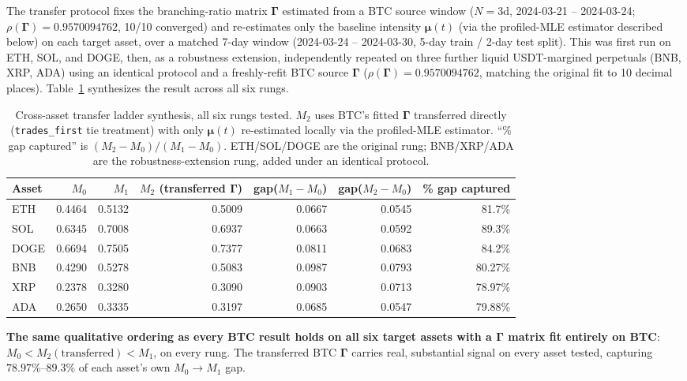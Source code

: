 The transfer protocol fixes the branching-ratio matrix
$\boldsymbol{\Gamma}$ estimated from a BTC source window
($N=3$d, 2024-03-21 -- 2024-03-24; $\rho(\boldsymbol\Gamma) = 0.9570094762$,
10/10 converged) and re-estimates only the baseline intensity
$\boldsymbol{\mu}(t)$ (via the profiled-MLE estimator described below) on
each target asset, over a matched 7-day window (2024-03-24 -- 2024-03-30,
5-day train / 2-day test split). This was first run on ETH, SOL, and DOGE,
then, as a robustness extension, independently repeated on three further
liquid USDT-margined perpetuals (BNB, XRP, ADA) using an identical
protocol and a freshly-refit BTC source $\boldsymbol\Gamma$
($\rho(\boldsymbol\Gamma)=0.9570094762$, matching the original fit to 10
decimal places). Table~\ref{tab:transfer-synthesis} synthesizes the
result across all six rungs.

\begin{table}[htbp]
\centering
\caption{Cross-asset transfer ladder synthesis, all six rungs tested.
$M_2$ uses BTC's fitted $\boldsymbol\Gamma$ transferred directly
(\texttt{trades\_first} tie treatment) with only $\boldsymbol\mu(t)$
re-estimated locally via the profiled-MLE estimator. ``\% gap captured''
is $(M_2-M_0)/(M_1-M_0)$. ETH/SOL/DOGE are the original rung; BNB/XRP/ADA
are the robustness-extension rung, added under an identical protocol.}
\label{tab:transfer-synthesis}
\begin{tabular}{@{}lrrrrrr@{}}
\toprule
Asset & $M_0$ & $M_1$ & $M_2$ (transferred $\boldsymbol\Gamma$) & gap($M_1-M_0$) & gap($M_2-M_0$) & \% gap captured \\
\midrule
ETH  & 0.4464 & 0.5132 & 0.5009 & 0.0667 & 0.0545 & 81.7\% \\
SOL  & 0.6345 & 0.7008 & 0.6937 & 0.0663 & 0.0592 & 89.3\% \\
DOGE & 0.6694 & 0.7505 & 0.7377 & 0.0811 & 0.0683 & 84.2\% \\
\addlinespace
BNB  & 0.4290 & 0.5278 & 0.5083 & 0.0987 & 0.0793 & 80.27\% \\
XRP  & 0.2378 & 0.3280 & 0.3090 & 0.0903 & 0.0713 & 78.97\% \\
ADA  & 0.2650 & 0.3335 & 0.3197 & 0.0685 & 0.0547 & 79.88\% \\
\bottomrule
\end{tabular}
\end{table}

\textbf{The same qualitative ordering as every BTC result holds on all
six target assets with a $\boldsymbol\Gamma$ matrix fit entirely on BTC}:
$M_0 < M_2(\text{transferred}) < M_1$, on every rung. The transferred BTC
$\boldsymbol\Gamma$ carries real, substantial signal on every asset
tested, capturing $78.97\%$--$89.3\%$ of each asset's own
$M_0\!\to\!M_1$ gap.

